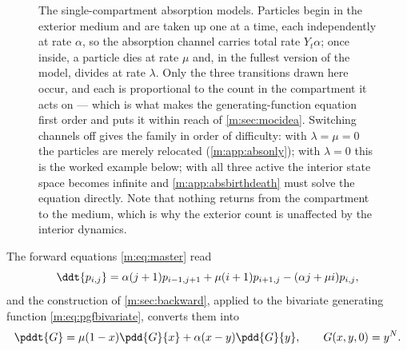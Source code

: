 \begin{figure}[ht]
\caption{The single-compartment absorption models. Particles begin in the exterior
medium and are taken up one at a time, each independently at rate $\alpha$, so the
absorption channel carries total rate $Y_t\alpha$; once inside, a particle dies at
rate $\mu$ and, in the fullest version of the model, divides at rate $\lambda$.
Only the three transitions drawn here occur, and each is proportional to the count
in the compartment it acts on --- which is what makes the generating-function
equation first order and puts it within reach of \cref{m:sec:mocidea}. Switching
channels off gives the family in order of difficulty: with $\lambda=\mu=0$ the
particles are merely relocated (\cref{m:app:absonly}); with $\lambda=0$ this is the
worked example below; with all three active the interior state space becomes
infinite and \cref{m:app:absbirthdeath} must solve the equation directly. Note that
nothing returns from the compartment to the medium, which is why the exterior
count is unaffected by the interior dynamics.}
\label{m:fig:compartment}
\end{figure}

The forward equations \cref{m:eq:master} read
\begin{equation}
\label{m:eq:FK2}
\ddt{p_{i,j}} = \alpha(j+1)p_{i-1,j+1} + \mu(i+1)p_{i+1,j} - (\alpha j+\mu i)p_{i,j},
\end{equation}
and the construction of \cref{m:sec:backward}, applied to the bivariate generating
function \cref{m:eq:pgfbivariate}, converts them into
\begin{equation}
\label{m:eq:PDE2}
\pddt{G} = \mu(1-x)\pdd{G}{x} + \alpha(x-y)\pdd{G}{y},
\qquad
G(x,y,0) = y^N .
\end{equation}

